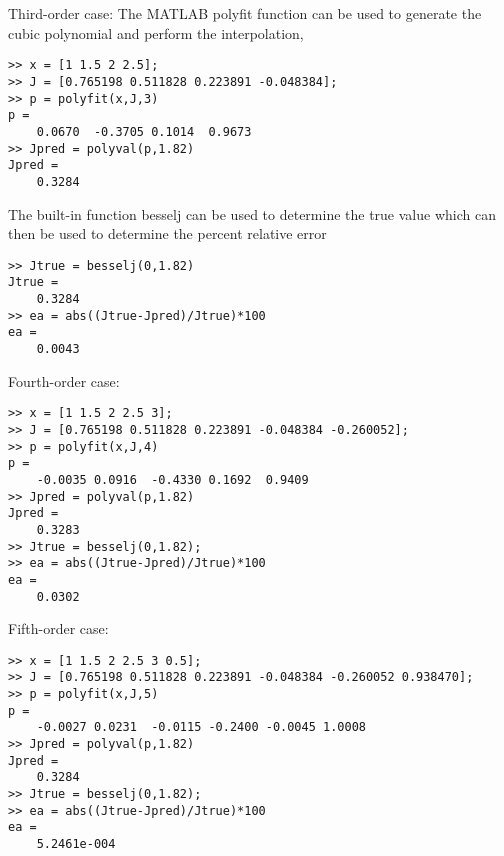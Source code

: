 \documentclass[../main.tex]{subfiles}
\begin{document}
\section{}
\begin{blockquote}
Third-order case: The MATLAB polyfit function can be used to generate the cubic
polynomial and perform the interpolation, 
\end{blockquote}
	\bigbreak
\begin{lstlisting}[numbers=none]
>> x = [1 1.5 2 2.5];
>> J = [0.765198 0.511828 0.223891 -0.048384];
>> p = polyfit(x,J,3)
p =
	0.0670	-0.3705	0.1014	0.9673
>> Jpred = polyval(p,1.82)
Jpred =
	0.3284
\end{lstlisting}
	\bigbreak
\begin{blockquote}
The built-in function besselj can be used to determine the true value which can then be
used to determine the percent relative error 
\end{blockquote}
	\bigbreak
\begin{lstlisting}[numbers=none]
>> Jtrue = besselj(0,1.82)
Jtrue =
	0.3284
>> ea = abs((Jtrue-Jpred)/Jtrue)*100
ea =
	0.0043
\end{lstlisting}
	\bigbreak
Fourth-order case:
	\bigbreak
\begin{lstlisting}[numbers=none]
>> x = [1 1.5 2 2.5 3];
>> J = [0.765198 0.511828 0.223891 -0.048384 -0.260052];
>> p = polyfit(x,J,4)
p =
	-0.0035	0.0916	-0.4330	0.1692	0.9409
>> Jpred = polyval(p,1.82)
Jpred =
	0.3283
>> Jtrue = besselj(0,1.82);
>> ea = abs((Jtrue-Jpred)/Jtrue)*100
ea =
	0.0302
\end{lstlisting}
	\bigbreak
Fifth-order case:
	\bigbreak
\begin{lstlisting}[numbers=none]
>> x = [1 1.5 2 2.5 3 0.5];
>> J = [0.765198 0.511828 0.223891 -0.048384 -0.260052 0.938470];
>> p = polyfit(x,J,5)
p =
	-0.0027	0.0231	-0.0115	-0.2400	-0.0045	1.0008
>> Jpred = polyval(p,1.82)
Jpred =
	0.3284
>> Jtrue = besselj(0,1.82);
>> ea = abs((Jtrue-Jpred)/Jtrue)*100
ea =
	5.2461e-004 
\end{lstlisting}
\end{document}
